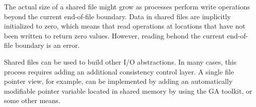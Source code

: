 The actual size of a shared file might grow as processes perform write operations
beyond the current end-of-file boundary.  Data in shared files are implicitly initialized 
to zero, which means that read operations at locations that have not been written to
return zero values.  However, reading behond the current end-of-file boundary is an
error.

Shared files can be used to build other I/O abstractions.  In many cases, this process
requires adding an additional consistency control layer.  A single file pointer view,
for example, can be implemented by adding an automatically modifiable pointer 
variable located in shared memory by using the GA toolkit, or some other means.
